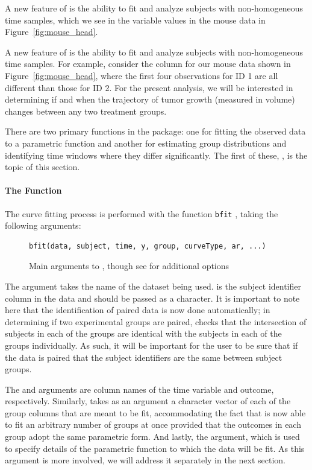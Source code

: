 A new feature of  is the ability to fit and analyze subjects with non-homogeneous time samples, which we see in the  variable values in the mouse data in Figure~\ref{fig:mouse_head}. 

A new feature of  is the ability to fit and analyze subjects with non-homogeneous time samples. For example, consider the  column for our mouse data shown in Figure~\ref{fig:mouse_head}, where the first four observations for ID 1 are all different than those for ID 2. For the present analysis, we will be interested in determining if and when the trajectory of tumor growth (measured in volume) changes between any two treatment groups.


There are two primary functions in the  package: one for fitting the observed data to a parametric function and another for estimating group distributions and identifying time windows where they differ significantly. The first of these, , is the topic of this section.


\paragraph{The  Function}

The curve fitting process is performed with the function \texttt{bfit} , taking the following arguments:


\begin{figure}[h!]
\centering
\begin{BVerbatim}
bfit(data, subject, time, y, group, curveType, ar, ...)
\end{BVerbatim}
\caption{Main arguments to , though see  for additional options}
\end{figure}



The  argument takes the name of the dataset being used.  is the subject identifier column in the data and should be passed as a character. It is important to note here that the identification of paired data is now done automatically; in determining if two experimental groups are paired,  checks that the intersection of subjects in each of the groups are identical with the subjects in each of the groups individually. As such, it will be important for the user to be sure that if the data is paired that the subject identifiers are the same between subject groups. 

The  and  arguments are column names of the time variable and outcome, respectively. Similarly,  takes as an argument a character vector of each of the group columns that are meant to be fit, accommodating the fact that  is now able to fit an arbitrary number of groups at once provided that the outcomes in each group adopt the same parametric form. And lastly, the  argument, which is used to specify details of the parametric function to which the data will be fit. As this argument is more involved, we will address it separately in the next section.



